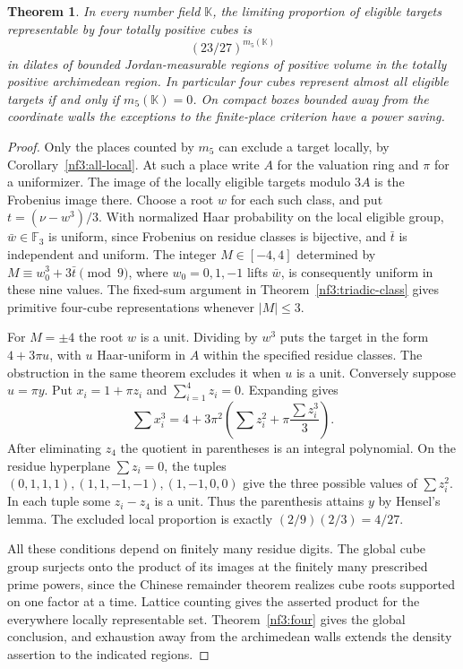 \documentclass[11pt,letterpaper]{article}
\newtheorem{theorem}{Theorem}[section]
\theoremstyle{definition}
\numberwithin{equation}{section}
\begin{document}
\begin{theorem}\label{thm:four-cube-exact-density}
In every number field $\mathbb K$, the limiting proportion of eligible
targets representable by four totally positive cubes is
\[
                             (23/27)^{m_5(\mathbb K)}
\]
in dilates of bounded Jordan-measurable regions of positive volume in
the totally positive archimedean region. In particular four cubes
represent almost all eligible targets if and only if
$m_5(\mathbb K)=0$. On compact boxes bounded away from the coordinate
walls the exceptions to the finite-place criterion have a power saving.
\end{theorem}
\begin{proof}
Only the places counted by $m_5$ can exclude a target locally, by
Corollary~\ref{nf3:all-local}. At such a place write $A$ for the
valuation ring and $\pi$ for a uniformizer. The image of the
locally eligible targets modulo $3A$ is the Frobenius image there.
Choose a root $w$ for each such class, and put
$t=(\nu-w^3)/3$. With normalized Haar probability on the local
eligible group, $\bar w\in\mathbb F_3$ is uniform, since Frobenius
on residue classes is bijective, and $\bar t$ is independent and
uniform. The integer $M\in[-4,4]$ determined by
$M\equiv w_0^3+3\bar t\pmod9$, where $w_0=0,1,-1$ lifts $\bar w$,
is consequently uniform in these nine values. The fixed-sum argument
in Theorem~\ref{nf3:triadic-class} gives primitive four-cube
representations whenever $|M|\le3$.

For $M=\pm4$ the root $w$ is a unit. Dividing by $w^3$ puts the
target in the form $4+3\pi u$, with $u$ Haar-uniform in $A$ within
the specified residue classes. The obstruction in the same theorem
excludes it when $u$ is a unit. Conversely suppose $u=\pi y$.
Put $x_i=1+\pi z_i$ and $\sum_{i=1}^4 z_i=0$. Expanding gives
\[
    \sum x_i^3=4+3\pi^2\left(\sum z_i^2+
                                    \pi\frac{\sum z_i^3}{3}\right).
\]
After eliminating $z_4$ the quotient in parentheses is an integral
polynomial. On the residue hyperplane $\sum z_i=0$, the tuples
$(0,1,1,1),(1,1,-1,-1),(1,-1,0,0)$ give the three possible values
of $\sum z_i^2$. In each tuple some $z_i-z_4$ is a unit. Thus
the parenthesis attains $y$ by Hensel's lemma. The excluded local
proportion is exactly $(2/9)(2/3)=4/27$.

All these conditions depend on finitely many residue digits. The
global cube group surjects onto the product of its images at the
finitely many prescribed prime powers, since the Chinese remainder
theorem realizes cube roots supported on one factor at a time.
Lattice counting gives the asserted product for the everywhere locally
representable set. Theorem~\ref{nf3:four} gives the global conclusion,
and exhaustion away from the archimedean walls extends the density
assertion to the indicated regions.
\end{proof}
\end{document}
